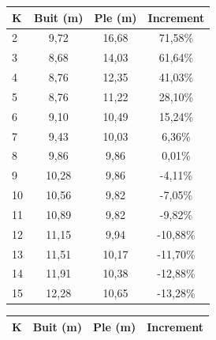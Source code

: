\begin{table}[h]
   \begin{center}
      \begin{tabular}{|l|c|c|c|}
        \hline
        \cellcolor[gray]{0.9} K & \cellcolor[gray]{0.9} Buit (m) & \cellcolor[gray]{0.9} Ple (m) & \cellcolor[gray]{0.9} Increment \\ \hline
        2  & 9,72  & 16,68 & 71,58\%  \\
        3  & 8,68  & 14,03 & 61,64\%  \\
        4  & 8,76  & 12,35 & 41,03\%  \\
        5  & 8,76  & 11,22 & 28,10\%  \\
        6  & 9,10  & 10,49 & 15,24\%  \\
        7  & 9,43  & 10,03 & 6,36\%   \\
        8  & 9,86  & 9,86  & 0,01\%   \\
        9  & 10,28 & 9,86  & -4,11\%  \\
        10 & 10,56 & 9,82  & -7,05\%  \\
        11 & 10,89 & 9,82  & -9,82\%  \\
        12 & 11,15 & 9,94  & -10,88\% \\
        13 & 11,51 & 10,17 & -11,70\% \\
        14 & 11,91 & 10,38 & -12,88\% \\
        15 & 12,28 & 10,65 & -13,28\% \\ \hline

      \end{tabular}
      
      \hspace{2pt}
      
      \begin{tabular}{|l|c|c|c|}
        \hline
        \cellcolor[gray]{0.9} K & \cellcolor[gray]{0.9} Buit (m) & \cellcolor[gray]{0.9} Ple (m) & \cellcolor[gray]{0.9} Increment \\ \hline


\end{tabular}
\end{center}
\end{table}

